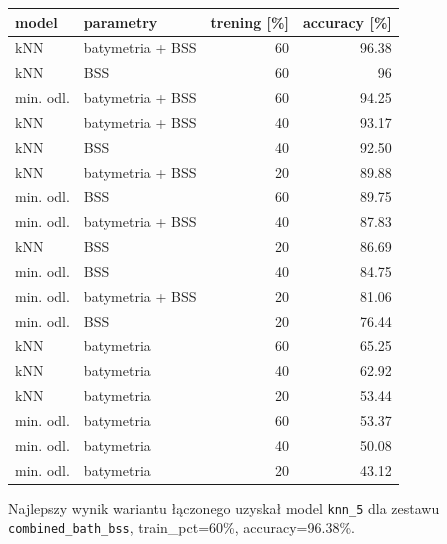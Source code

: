 \documentclass[11pt,a4paper]{article}
\begin{document}
\begin{table}[H]
\centering
\small
\begin{tabular}{llrr}
\toprule
model & parametry & trening [\%] & accuracy [\%] \\
\midrule
kNN & batymetria + BSS & 60 & 96.38 \\
kNN & BSS & 60 & 96 \\
min. odl. & batymetria + BSS & 60 & 94.25 \\
kNN & batymetria + BSS & 40 & 93.17 \\
kNN & BSS & 40 & 92.50 \\
kNN & batymetria + BSS & 20 & 89.88 \\
min. odl. & BSS & 60 & 89.75 \\
min. odl. & batymetria + BSS & 40 & 87.83 \\
kNN & BSS & 20 & 86.69 \\
min. odl. & BSS & 40 & 84.75 \\
min. odl. & batymetria + BSS & 20 & 81.06 \\
min. odl. & BSS & 20 & 76.44 \\
kNN & batymetria & 60 & 65.25 \\
kNN & batymetria & 40 & 62.92 \\
kNN & batymetria & 20 & 53.44 \\
min. odl. & batymetria & 60 & 53.37 \\
min. odl. & batymetria & 40 & 50.08 \\
min. odl. & batymetria & 20 & 43.12 \\
\bottomrule
\end{tabular}
\end{table}

Najlepszy wynik wariantu łączonego uzyskał model \texttt{knn\_5} dla zestawu \texttt{combined\_bath\_bss}, train\_pct=60\%, accuracy=96.38\%.
\end{document}
